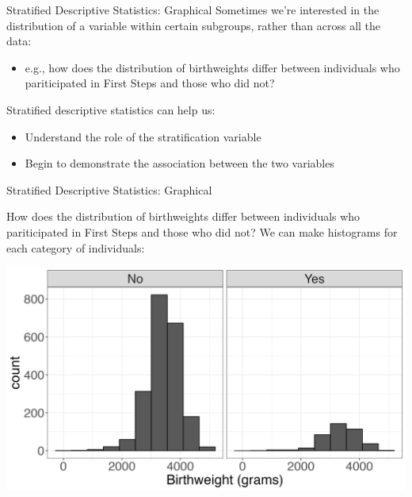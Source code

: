 \documentclass[10pt,t]{beamer}
\begin{document}
\begin{frame}{Stratified Descriptive Statistics: Graphical}
Sometimes we're interested in the distribution of a variable within certain subgroups, rather than across all the data:

\vspace{0.3cm}

\begin{itemize}
	\item e.g., how does the distribution of birthweights differ between individuals who pariticipated in First Steps and those who did not?
\end{itemize}

\vspace{0.3cm}

Stratified descriptive statistics can help us:

\vspace{0.3cm}

\begin{itemize}
	\item Understand the role of the stratification variable
	\item Begin to demonstrate the association between the two variables
\end{itemize}

\end{frame}

\begin{frame}{Stratified Descriptive Statistics: Graphical}

How does the distribution of birthweights differ between individuals who pariticipated in First Steps and those who did not? We can make histograms for each category of individuals:

\vspace{0.3cm}

\centering \includegraphics[scale=0.3]{fs_hist_firstep.png}

\end{frame}
\end{document}
